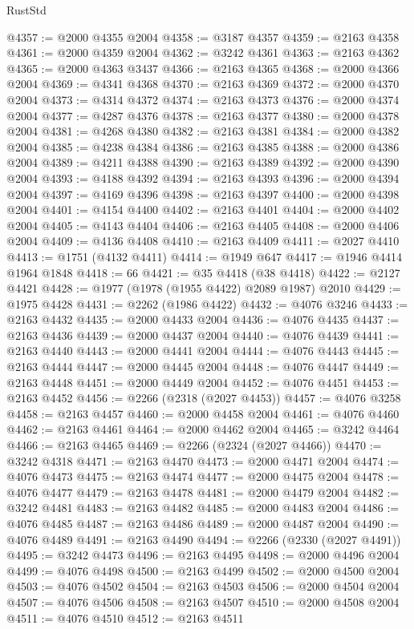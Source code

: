 \begin{lexlean}{RustStd}
\begin{coremodule}
@4357 := @2000 @4355 @2004
@4358 := @3187 @4357
@4359 := @2163 @4358
@4361 := @2000 @4359 @2004
@4362 := @3242 @4361
@4363 := @2163 @4362
@4365 := @2000 @4363 @3437
@4366 := @2163 @4365
@4368 := @2000 @4366 @2004
@4369 := @4341 @4368
@4370 := @2163 @4369
@4372 := @2000 @4370 @2004
@4373 := @4314 @4372
@4374 := @2163 @4373
@4376 := @2000 @4374 @2004
@4377 := @4287 @4376
@4378 := @2163 @4377
@4380 := @2000 @4378 @2004
@4381 := @4268 @4380
@4382 := @2163 @4381
@4384 := @2000 @4382 @2004
@4385 := @4238 @4384
@4386 := @2163 @4385
@4388 := @2000 @4386 @2004
@4389 := @4211 @4388
@4390 := @2163 @4389
@4392 := @2000 @4390 @2004
@4393 := @4188 @4392
@4394 := @2163 @4393
@4396 := @2000 @4394 @2004
@4397 := @4169 @4396
@4398 := @2163 @4397
@4400 := @2000 @4398 @2004
@4401 := @4154 @4400
@4402 := @2163 @4401
@4404 := @2000 @4402 @2004
@4405 := @4143 @4404
@4406 := @2163 @4405
@4408 := @2000 @4406 @2004
@4409 := @4136 @4408
@4410 := @2163 @4409
@4411 := @2027 @4410
@4413 := @1751 (@4132 @4411)
@4414 := @1949 @647
@4417 := @1946 @4414 @1964 @1848
@4418 := 66
@4421 := @35 @4418 (@38 @4418)
@4422 := @2127 @4421
@4428 := @1977 (@1978 (@1955 @4422) @2089 @1987) @2010
@4429 := @1975 @4428
@4431 := @2262 (@1986 @4422)
@4432 := @4076 @3246
@4433 := @2163 @4432
@4435 := @2000 @4433 @2004
@4436 := @4076 @4435
@4437 := @2163 @4436
@4439 := @2000 @4437 @2004
@4440 := @4076 @4439
@4441 := @2163 @4440
@4443 := @2000 @4441 @2004
@4444 := @4076 @4443
@4445 := @2163 @4444
@4447 := @2000 @4445 @2004
@4448 := @4076 @4447
@4449 := @2163 @4448
@4451 := @2000 @4449 @2004
@4452 := @4076 @4451
@4453 := @2163 @4452
@4456 := @2266 (@2318 (@2027 @4453))
@4457 := @4076 @3258
@4458 := @2163 @4457
@4460 := @2000 @4458 @2004
@4461 := @4076 @4460
@4462 := @2163 @4461
@4464 := @2000 @4462 @2004
@4465 := @3242 @4464
@4466 := @2163 @4465
@4469 := @2266 (@2324 (@2027 @4466))
@4470 := @3242 @4318
@4471 := @2163 @4470
@4473 := @2000 @4471 @2004
@4474 := @4076 @4473
@4475 := @2163 @4474
@4477 := @2000 @4475 @2004
@4478 := @4076 @4477
@4479 := @2163 @4478
@4481 := @2000 @4479 @2004
@4482 := @3242 @4481
@4483 := @2163 @4482
@4485 := @2000 @4483 @2004
@4486 := @4076 @4485
@4487 := @2163 @4486
@4489 := @2000 @4487 @2004
@4490 := @4076 @4489
@4491 := @2163 @4490
@4494 := @2266 (@2330 (@2027 @4491))
@4495 := @3242 @4473
@4496 := @2163 @4495
@4498 := @2000 @4496 @2004
@4499 := @4076 @4498
@4500 := @2163 @4499
@4502 := @2000 @4500 @2004
@4503 := @4076 @4502
@4504 := @2163 @4503
@4506 := @2000 @4504 @2004
@4507 := @4076 @4506
@4508 := @2163 @4507
@4510 := @2000 @4508 @2004
@4511 := @4076 @4510
@4512 := @2163 @4511

\end{coremodule}
\end{lexlean}
